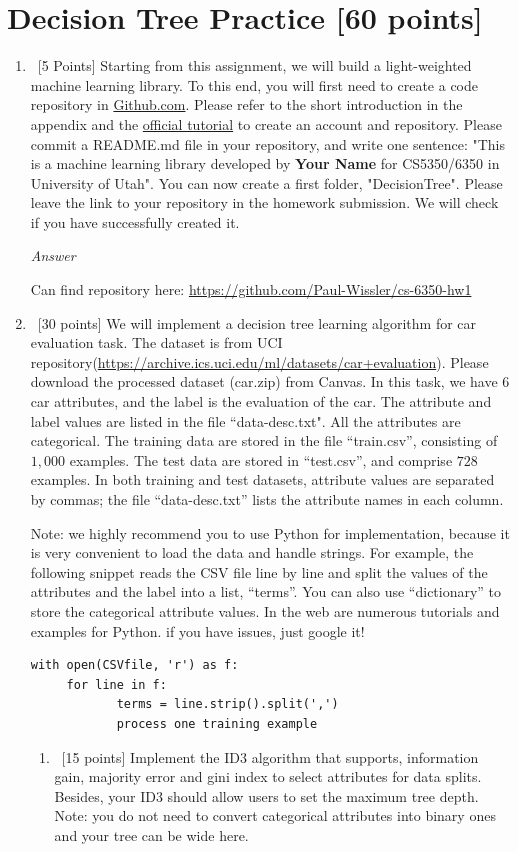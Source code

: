 \documentclass[12pt, fullpage,letterpaper]{article}
\begin{document}
\section{Decision Tree Practice [60 points]}
\begin{enumerate}
	\item~[5 Points] Starting from this assignment, we will build a light-weighted machine learning library. 
To this end, you will first need to create a code repository in \href{https://github.com/}{Github.com}. Please refer to the short introduction in the appendix and the \href{https://guides.github.com/activities/hello-world/}{official tutorial} to create an account and repository. Please commit a README.md file in your repository, and write one sentence: "This is a machine learning library developed by \textbf{Your Name} for CS5350/6350 in University of Utah".  You can now create a first folder, "DecisionTree". Please leave the link to your repository in the homework submission. We will check if you have successfully created it. 

\emph{Answer}

Can find repository here: \url{https://github.com/Paul-Wissler/cs-6350-hw1}

\item~[30 points] We will implement a decision tree learning algorithm for car evaluation task. The dataset is from UCI repository(\url{https://archive.ics.uci.edu/ml/datasets/car+evaluation}). Please download the processed dataset (car.zip) from Canvas.  In this task, we have $6$ car attributes, and the label is the evaluation of the car. The attribute and label values are listed in the file ``data-desc.txt". All the attributes are categorical.  The training data are stored in the file ``train.csv'', consisting of $1,000$ examples. The test data are stored in ``test.csv'', and comprise $728$ examples. In both training and test datasets, attribute values are separated by commas; the file ``data-desc.txt''  lists the attribute names in each column. 

\noindent Note: we highly recommend you to use Python for implementation, because it is very convenient to load the data and handle strings. For example, the following snippet reads the CSV file line by line and split the values of the attributes and the label into a list, ``terms''. You can also use ``dictionary'' to store the categorical attribute values. In the web are numerous tutorials and examples for Python. if you have issues, just google it!
\begin{lstlisting}
with open(CSVfile, 'r') as f:
     for line in f:
            terms = line.strip().split(',')
            process one training example
\end{lstlisting}
\begin{enumerate}
\item~[15 points] Implement the ID3 algorithm that supports, information gain,  majority error and gini index to select attributes for data splits. Besides, your ID3 should allow users to set the maximum tree depth. Note: you do not need to convert categorical attributes into binary ones and your tree can be wide here.


\end{enumerate}
\end{enumerate}
\end{document}
